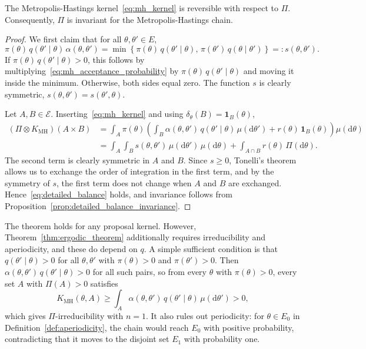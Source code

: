 \begin{theorem}
    \label{thm:mh_detailed_balance}
    The Metropolis-Hastings kernel~\eqref{eq:mh_kernel} is reversible with respect to $\Pi$. Consequently, $\Pi$ is invariant for the Metropolis-Hastings chain.
\end{theorem}
\begin{proof}
    We first claim that for all $\theta,\theta'\in E$,
    \begin{equation}
        \pi(\theta)\,q(\theta'\mid\theta)\,\alpha(\theta,\theta') = \min\left\{\pi(\theta)\,q(\theta'\mid\theta),\,\pi(\theta')\,q(\theta\mid\theta')\right\} =: s(\theta,\theta').
        \label{eq:mh_symmetric_flux}
    \end{equation}
    If $\pi(\theta)\,q(\theta'\mid\theta)>0$, this follows by multiplying~\eqref{eq:mh_acceptance_probability} by $\pi(\theta)\,q(\theta'\mid\theta)$ and moving it inside the minimum. Otherwise, both sides equal zero. The function $s$ is clearly symmetric, $s(\theta,\theta') = s(\theta',\theta)$.

    Let $A,B\in\mathcal{E}$. Inserting~\eqref{eq:mh_kernel} and using $\delta_\theta(B) = \mathbf{1}_B(\theta)$,
    \begin{align}
        (\Pi\otimes K_{\mathrm{MH}})(A\times B) &= \int_A\pi(\theta)\left(\int_B\alpha(\theta,\theta')\,q(\theta'\mid\theta)\,\mu(\mathrm{d}\theta') + r(\theta)\,\mathbf{1}_B(\theta)\right)\mu(\mathrm{d}\theta) \\
        &= \int_A\int_Bs(\theta,\theta')\,\mu(\mathrm{d}\theta')\,\mu(\mathrm{d}\theta) + \int_{A\cap B}r(\theta)\,\Pi(\mathrm{d}\theta).
    \end{align}
    The second term is clearly symmetric in $A$ and $B$. Since $s\ge0$, Tonelli's theorem allows us to exchange the order of integration in the first term, and by the symmetry of $s$, the first term does not change when $A$ and $B$ are exchanged. Hence~\eqref{eq:detailed_balance} holds, and invariance follows from Proposition~\ref{prop:detailed_balance_invariance}.
\end{proof}

The theorem holds for any proposal kernel. However, Theorem~\ref{thm:ergodic_theorem} additionally requires irreducibility and aperiodicity, and these do depend on $q$. A simple sufficient condition is that $q(\theta'\mid\theta)>0$ for all $\theta,\theta'$ with $\pi(\theta)>0$ and $\pi(\theta')>0$. Then $\alpha(\theta,\theta')\,q(\theta'\mid\theta)>0$ for all such pairs, so from every $\theta$ with $\pi(\theta)>0$, every set $A$ with $\Pi(A)>0$ satisfies
\begin{equation}
    K_{\mathrm{MH}}(\theta,A)\ge\int_A\alpha(\theta,\theta')\,q(\theta'\mid\theta)\,\mu(\mathrm{d}\theta')>0,
\end{equation}
which gives $\Pi$-irreducibility with $n=1$. It also rules out periodicity: for $\theta\in E_0$ in Definition~\ref{def:aperiodicity}, the chain would reach $E_0$ with positive probability, contradicting that it moves to the disjoint set $E_1$ with probability one.

